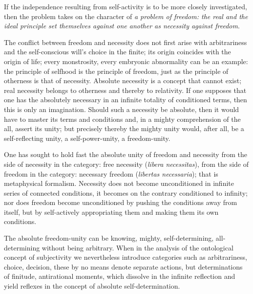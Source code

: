 \documentclass[12pt]{article}
\begin{document}
If the independence resulting from self-activity is to be more closely
investigated, then the problem takes on the character of \emph{a problem of
freedom: the real and the ideal principle set themselves against one another
as necessity against freedom}.

The conflict between freedom and necessity does not first arise with
arbitrariness and the self-conscious will's choice in the finite; its origin
coincides with the origin of life; every monstrosity, every embryonic
abnormality can be an example: the principle of selfhood is the principle of
freedom, just as the principle of otherness is that of necessity. Absolute
necessity is a concept that cannot exist; real necessity belongs to otherness
and thereby to relativity. If one supposes that one has the absolutely
necessary in an infinite totality of conditioned terms, then this is only an
imagination. Should such a necessity be absolute, then it would have to
master its terms and conditions and, in a mighty comprehension of the all,
assert its unity; but precisely thereby the mighty unity would, after all, be
a self-reflecting unity, a self-power-unity, a freedom-unity.

One has sought to hold fast the absolute unity of freedom and necessity from
the side of necessity in the category: free necessity (\textit{libera
necessitas}), from the side of freedom in the category: necessary freedom
(\textit{libertas necessaria}); that is metaphysical formalism. Necessity
does not become unconditioned in infinite
series of connected conditions, it becomes on the contrary conditioned to
infinity; nor does freedom become unconditioned by pushing the conditions
away from itself, but by self-actively appropriating them and making them its
own conditions.

The absolute freedom-unity can be knowing, mighty, self-determining,
all-determining without being arbitrary. When in the analysis of the
ontological concept of subjectivity we nevertheless introduce categories such
as arbitrariness, choice, decision, these by no means denote separate
actions, but determinations of finitude, antirational moments, which dissolve
in the infinite reflection and yield reflexes in the concept of absolute
self-determination.
\end{document}
